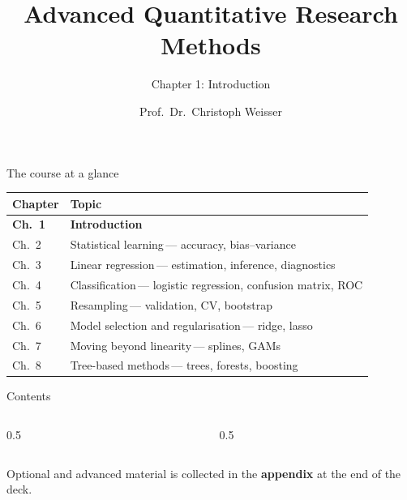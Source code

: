 \documentclass[aspectratio=169,11pt]{beamer}
\title{Advanced Quantitative Research Methods}
\subtitle{Chapter 1: Introduction}
\author{Prof.\ Dr.\ Christoph Weisser}
\date{}\graphicspath{{images/}}
\begin{document}
\begin{frame}[plain]\titlepage\end{frame}

\begin{frame}{The course at a glance}
  \vspace{-1.5mm}
  \begin{center}
  \scriptsize
  \setlength{\tabcolsep}{5pt}
  \renewcommand{\arraystretch}{1.30}
  \begin{tabular}{@{\hspace{2pt}}l >{\raggedright\arraybackslash}p{}@{\hspace{2pt}}}
    \toprule
    \textbf{Chapter} & \textbf{Topic} \\
    \midrule
    \rowcolor{accent!18} \textbf{Ch.\ 1} & \textbf{Introduction} \\
    \rowcolor{black!3} {\color{accent}Ch.\ 2} & Statistical learning\,{\color{black!45}--- accuracy, bias--variance} \\
     {\color{accent}Ch.\ 3} & Linear regression\,{\color{black!45}--- estimation, inference, diagnostics} \\
    \rowcolor{black!3} {\color{accent}Ch.\ 4} & Classification\,{\color{black!45}--- logistic regression, confusion matrix, ROC} \\
     {\color{accent}Ch.\ 5} & Resampling\,{\color{black!45}--- validation, CV, bootstrap} \\
    \rowcolor{black!3} {\color{accent}Ch.\ 6} & Model selection and regularisation\,{\color{black!45}--- ridge, lasso} \\
     {\color{accent}Ch.\ 7} & Moving beyond linearity\,{\color{black!45}--- splines, GAMs} \\
    \rowcolor{black!3} {\color{accent}Ch.\ 8} & Tree-based methods\,{\color{black!45}--- trees, forests, boosting} \\
    \bottomrule
  \end{tabular}
  \end{center}
\end{frame}


\begin{frame}{Contents}
  \begin{columns}[t]
    \begin{column}{0.5\textwidth}
      \tableofcontents[hideallsubsections,sections={1-4}]
    \end{column}
    \begin{column}{0.5\textwidth}
      \tableofcontents[hideallsubsections,sections={5-8}]
    \end{column}
  \end{columns}
  \vfill
  {\tiny Optional and advanced material is collected in the \textbf{appendix} at the end of the deck.}
\end{frame}
\end{document}
